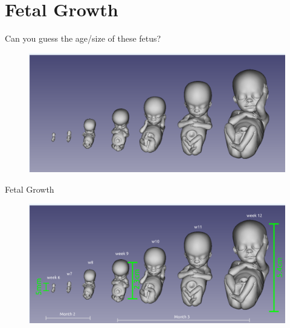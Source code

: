 \section{Fetal Growth}



{
\begin{frame}{Can you guess the age/size of these fetus?}
      \begin{figure}
        \centering
        \includegraphics[width=1.0\textwidth]{./figures/fetal-ages/versions/drawing-v00.png}
      \end{figure}
\end{frame}
}

{
\begin{frame}{Fetal Growth}
      \begin{figure}
        \centering
        \includegraphics[width=1.0\textwidth]{./figures/fetal-ages/versions/drawing-v01.png}
      \end{figure}
\end{frame}
}